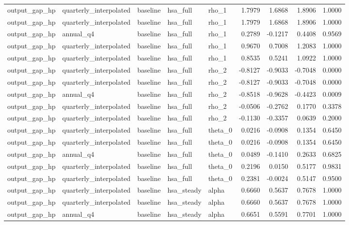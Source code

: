 \begin{tabular}{lllllrrrr}
output\_gap\_hp & quarterly\_interpolated & baseline & hsa\_full & rho\_1 & 1.7979 & 1.6868 & 1.8906 & 1.0000 \\
output\_gap\_hp & quarterly\_interpolated & baseline & hsa\_full & rho\_1 & 1.7979 & 1.6868 & 1.8906 & 1.0000 \\
output\_gap\_hp & annual\_q4 & baseline & hsa\_full & rho\_1 & 0.2789 & -0.1217 & 0.4408 & 0.9569 \\
output\_gap\_hp & quarterly\_interpolated & baseline & hsa\_full & rho\_1 & 0.9670 & 0.7008 & 1.2083 & 1.0000 \\
output\_gap\_hp & quarterly\_interpolated & baseline & hsa\_full & rho\_1 & 0.8535 & 0.5241 & 1.0922 & 1.0000 \\
output\_gap\_hp & quarterly\_interpolated & baseline & hsa\_full & rho\_2 & -0.8127 & -0.9033 & -0.7048 & 0.0000 \\
output\_gap\_hp & quarterly\_interpolated & baseline & hsa\_full & rho\_2 & -0.8127 & -0.9033 & -0.7048 & 0.0000 \\
output\_gap\_hp & annual\_q4 & baseline & hsa\_full & rho\_2 & -0.8518 & -0.9628 & -0.4423 & 0.0009 \\
output\_gap\_hp & quarterly\_interpolated & baseline & hsa\_full & rho\_2 & -0.0506 & -0.2762 & 0.1770 & 0.3378 \\
output\_gap\_hp & quarterly\_interpolated & baseline & hsa\_full & rho\_2 & -0.1130 & -0.3357 & 0.0639 & 0.2000 \\
output\_gap\_hp & quarterly\_interpolated & baseline & hsa\_full & theta\_0 & 0.0216 & -0.0908 & 0.1354 & 0.6450 \\
output\_gap\_hp & quarterly\_interpolated & baseline & hsa\_full & theta\_0 & 0.0216 & -0.0908 & 0.1354 & 0.6450 \\
output\_gap\_hp & annual\_q4 & baseline & hsa\_full & theta\_0 & 0.0489 & -0.1410 & 0.2633 & 0.6825 \\
output\_gap\_hp & quarterly\_interpolated & baseline & hsa\_full & theta\_0 & 0.2196 & 0.0150 & 0.5177 & 0.9831 \\
output\_gap\_hp & quarterly\_interpolated & baseline & hsa\_full & theta\_0 & 0.2381 & -0.0024 & 0.5147 & 0.9500 \\
output\_gap\_hp & quarterly\_interpolated & baseline & hsa\_steady & alpha & 0.6660 & 0.5637 & 0.7678 & 1.0000 \\
output\_gap\_hp & quarterly\_interpolated & baseline & hsa\_steady & alpha & 0.6660 & 0.5637 & 0.7678 & 1.0000 \\
output\_gap\_hp & annual\_q4 & baseline & hsa\_steady & alpha & 0.6651 & 0.5591 & 0.7701 & 1.0000 \\

\end{tabular}

